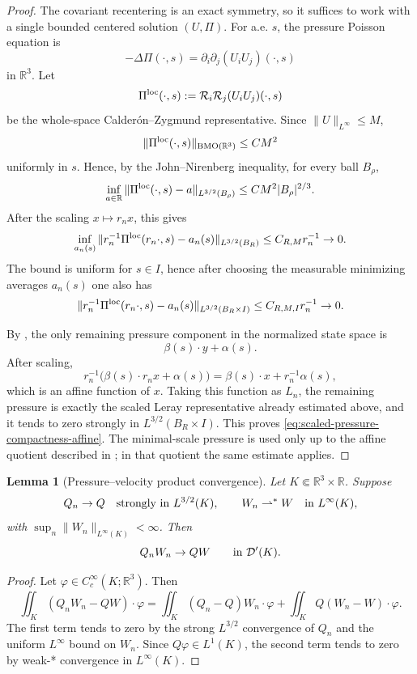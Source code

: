 \documentclass[11pt]{amsart}
\numberwithin{equation}{section}
\theoremstyle{plain}
\newtheorem{lemma}[theorem]{Lemma}
\theoremstyle{definition}
\theoremstyle{remark}
\begin{document}
\begin{proof}
The covariant recentering is an exact symmetry, so it suffices to work with a
single bounded centered solution \((U,\Pi)\).  For a.e. \(s\), the pressure
Poisson equation is
\[
   -\Delta\Pi(\cdot,s)=\partial_i\partial_j(U_iU_j)(\cdot,s)
\]
in \(\mathbb R^3\).  Let
\[
   \Pi^{\rm loc}(\cdot,s):=\mathcal R_i\mathcal R_j(U_iU_j)(\cdot,s)
\]
be the whole-space Calder\'on--Zygmund representative.  Since
\(\|U\|_{L^\infty}\le M\),
\[
   \|\Pi^{\rm loc}(\cdot,s)\|_{\mathrm{BMO}(\mathbb R^3)}
   \le C M^2
\]
uniformly in \(s\).  Hence, by the John--Nirenberg inequality, for every ball
\(B_\rho\),
\[
   \inf_{a\in\mathbb R}
   \|\Pi^{\rm loc}(\cdot,s)-a\|_{L^{3/2}(B_\rho)}
   \le C M^2 |B_\rho|^{2/3}.
\]
After the scaling \(x\mapsto r_nx\), this gives
\[
   \inf_{a_n(s)}
   \|r_n^{-1}\Pi^{\rm loc}(r_n\cdot,s)-a_n(s)\|_{L^{3/2}(B_R)}
   \le C_{R,M}r_n^{-1}\to0 .
\]
The bound is uniform for \(s\in I\), hence after choosing the measurable
minimizing averages \(a_n(s)\) one also has
\[
   \|r_n^{-1}\Pi^{\rm loc}(r_n\cdot,s)-a_n(s)\|_{L^{3/2}(B_R\times I)}
   \le C_{R,M,I}r_n^{-1}\to0 .
\]

By , the only remaining pressure
component in the normalized state space is
\[
   \beta(s)\cdot y+\alpha(s).
\]
After scaling,
\[
   r_n^{-1}\bigl(\beta(s)\cdot r_nx+\alpha(s)\bigr)
   =
   \beta(s)\cdot x+r_n^{-1}\alpha(s),
\]
which is an affine function of \(x\).  Taking this function as \(L_n\), the
remaining pressure is exactly the scaled Leray representative already estimated
above, and it tends to zero strongly in \(L^{3/2}(B_R\times I)\).  This proves
\eqref{eq:scaled-pressure-compactness-affine}.  The minimal-scale pressure is used
only up to the affine quotient described in
; in that quotient the same estimate
applies.
\end{proof}

\begin{lemma}[Pressure--velocity product convergence]
\label{lem:pressure-velocity-product-convergence}
Let \(K\Subset\mathbb R^3\times\mathbb R\).  Suppose
\[
   Q_n\to Q\quad\hbox{strongly in }L^{3/2}(K),
   \qquad
   W_n\rightharpoonup^\ast W\quad\hbox{in }L^\infty(K),
\]
with \(\sup_n\|W_n\|_{L^\infty(K)}<\infty\).  Then
\[
   Q_nW_n\to QW
   \qquad\hbox{in }\mathcal D'(K).
\]
\end{lemma}

\begin{proof}
Let \(\varphi\in C_c^\infty(K;\mathbb R^3)\).  Then
\[
   \iint_K (Q_nW_n-QW)\cdot\varphi
   =
   \iint_K (Q_n-Q)W_n\cdot\varphi
   +\iint_K Q(W_n-W)\cdot\varphi .
\]
The first term tends to zero by the strong \(L^{3/2}\) convergence of \(Q_n\)
and the uniform \(L^\infty\) bound on \(W_n\).  Since \(Q\varphi\in L^1(K)\),
the second term tends to zero by weak-* convergence in \(L^\infty(K)\).
\end{proof}
\end{document}
